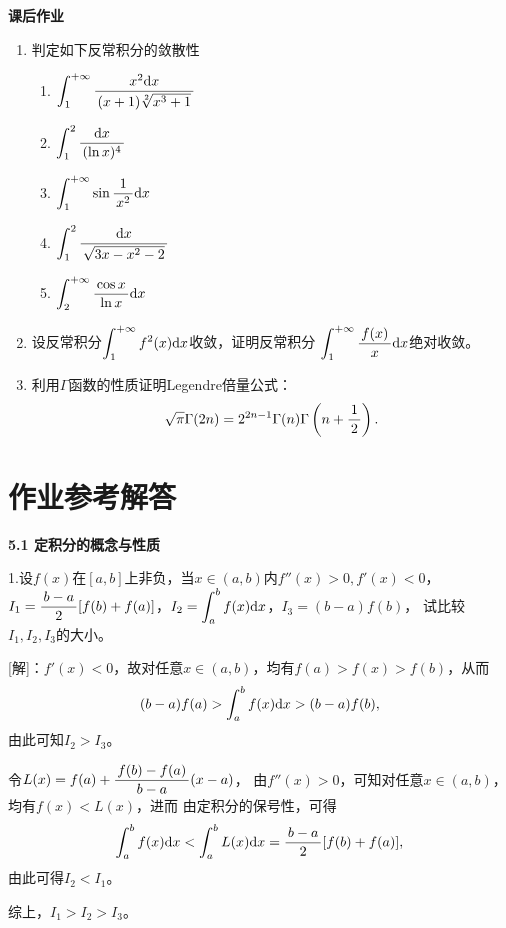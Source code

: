 \begin{ext}
	{\bf 课后作业}	
	\begin{enumerate}
	  \item 判定如下反常积分的敛散性
	  \begin{enumerate}[(1)]
	    \item $\displaystyle\int_1^{+\infty}\displaystyle\frac{\,{x^2\mathrm{d} x}\,}{\,{(x+1)\sqrt[2]{x^3+1}}\,}$
	    \item $\displaystyle\int_1^2\displaystyle\frac{\,{\mathrm{d} x}\,}{\,{(\ln x)^4}\,}$
	    \item $\displaystyle\int_1^{+\infty}\sin\displaystyle\frac{\,{1}\,}{\,{x^2}\,}\mathrm{d} x$
	    \item $\displaystyle\int_1^2\displaystyle\frac{\,{\mathrm{d} x}\,}{\,{\sqrt{3x-x^2-2}}\,}$
	    \item $\displaystyle\int_2^{+\infty}\displaystyle\frac{\,{\cos x}\,}{\,{\ln x}\,}\mathrm{d} x$
	  \end{enumerate}
	  \item 设反常积分$\displaystyle\int_1^{+\infty}f^2(x)\mathrm{d} x$收敛，证明反常积分
	  $\displaystyle\int_1^{+\infty}\displaystyle\frac{\,{f(x)}\,}{\,{x}\,}\mathrm{d} x$绝对收敛。
	  \item 利用$\Gamma$函数的性质证明{\kaishu Legendre倍量公式}：
	  $$\sqrt{\pi}\Gamma(2n)=2^{2n-1}\Gamma(n)\Gamma\left(n+\displaystyle\frac{\,{1}\,}{\,{2}\,}\right).$$
	\end{enumerate}
\end{ext}

\visibletrue

\ifvisible

\newpage

\section*{作业参考解答}

\begin{center}
	\bf 5.1 定积分的概念与性质
\end{center}

\bigskip

1.设$f(x)$在$[a,b]$上非负，当$x\in(a,b)$内$f''(x)>0,f'(x)<0$，
$I_1=\displaystyle\frac{\,{b-a}\,}{\,{2}\,}[f(b)+f(a)]$，$I_2=\displaystyle\int_a^bf(x)\mathrm{d} x$，$I_3=(b-a)f(b)$，
试比较$I_1,I_2,I_3$的大小。

[解]：$f'(x)<0$，故对任意$x\in(a,b)$，均有$f(a)>f(x)>f(b)$，从而
$$(b-a)f(a)>\displaystyle\int_a^bf(x)\mathrm{d} x>(b-a)f(b),$$
由此可知$I_2>I_3$。

令$L(x)=f(a)+\displaystyle\frac{\,{f(b)-f(a)}\,}{\,{b-a}\,}(x-a)$，
由$f''(x)>0$，可知对任意$x\in(a,b)$，均有$f(x)<L(x)$，进而
由定积分的保号性，可得
$$\displaystyle\int_a^bf(x)\mathrm{d} x<\displaystyle\int_a^bL(x)\mathrm{d} x=\displaystyle\frac{\,{b-a}\,}{\,{2}\,}[f(b)+f(a)],$$
由此可得$I_2<I_1$。

综上，$I_1>I_2>I_3$。\fin

